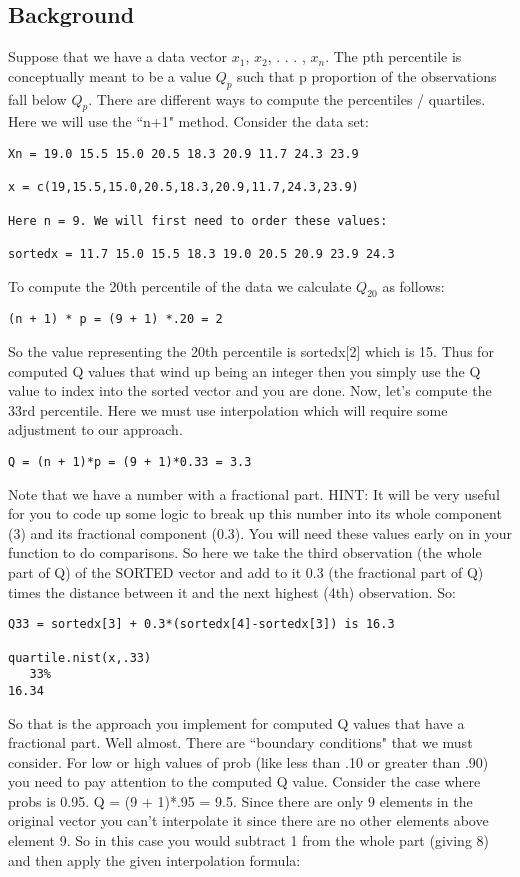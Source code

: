 \documentclass{article}
\begin{document}
\subsection{Background}
Suppose that we have a data vector $x_1$, $x_2$, . . . , $x_n$. The pth percentile is conceptually meant to be a value $Q_p$ such that p proportion of the observations fall below $Q_p$. There are different ways to compute the percentiles / quartiles. Here we will use the ``n+1" method. Consider the data set:
\begin{verbatim}
Xn = 19.0 15.5 15.0 20.5 18.3 20.9 11.7 24.3 23.9  

x = c(19,15.5,15.0,20.5,18.3,20.9,11.7,24.3,23.9)

Here n = 9. We will first need to order these values:

sortedx = 11.7 15.0 15.5 18.3 19.0 20.5 20.9 23.9 24.3

\end{verbatim}
\noindent
To compute the 20th  percentile of the data we calculate $Q_{20}$ as follows:
\begin{verbatim}
(n + 1) * p = (9 + 1) *.20 = 2
\end{verbatim}
\noindent
So the value representing the 20th percentile is sortedx[2] which is 15.
Thus for computed Q values that wind up being an integer then you simply use the Q value to index into the sorted vector and you are done. Now, let's compute the 33rd percentile. Here we must use interpolation which will require some adjustment to our approach.
\begin{verbatim}
Q = (n + 1)*p = (9 + 1)*0.33 = 3.3 
\end{verbatim}
\noindent
Note that we have a number with a fractional part. HINT: It will be very useful for you to code up some logic to break up this number into its whole component (3) and its fractional component (0.3). You will need these values early on in your function to do comparisons. So here we take the third observation (the whole part of Q) of the SORTED vector and add to it 0.3 (the fractional part of Q) times the distance between it and the next highest (4th) observation. So:
\begin{verbatim}
Q33 = sortedx[3] + 0.3*(sortedx[4]-sortedx[3]) is 16.3

quartile.nist(x,.33)
   33% 
16.34 
\end{verbatim}
\noindent
So that is the approach you implement for computed Q values that have a fractional part. Well almost. There are ``boundary conditions" that we must consider. For low or high values of prob (like less than .10 or greater than .90) you need to pay attention to the computed Q value. Consider the case where probs is 0.95. Q = (9 + 1)*.95 = 9.5. Since there are only 9 elements in the original vector you can't interpolate it since there are no other elements above element 9. So in this case you would subtract 1 from the whole part (giving 8) and then apply the given interpolation formula:
\end{document}
